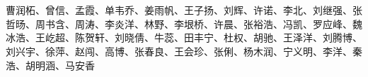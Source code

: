 \documentclass[11pt]{book} %
\begin{document}
\newpage
~\vfill
\thispagestyle{empty}

{\large
{} \\

\noindent 曹润柘、曾信、孟霞、单韦乔、姜雨帆、王子扬、刘辉、许诺、李北、刘继强、张哲旸、周书含、周涛、李炎洋、林野、李垠桥、许晨、张裕浩、冯凯、罗应峰、魏冰浩、王屹超、陈贺轩、刘晓倩、牛蕊、田丰宁、杜权、胡驰、王泽洋、刘腾博、刘兴宇、徐萍、赵闯、高博、张春良、王会珍、张俐、杨木润、宁义明、李洋、秦浩、胡明涵、马安香 \\
}

\newpage


{} %
\pagestyle{empty} %
\tableofcontents %
\cleardoublepage %
\pagestyle{fancy} %


















\cleardoublepage %
\printbibliography


\cleardoublepage %
\printindex %


\end{document}
